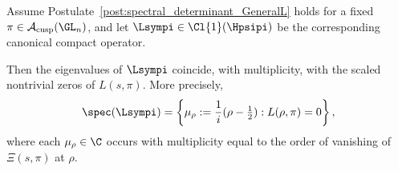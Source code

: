 \begin{lemma}%
\label{lem:zero_encoding_general}
Assume Postulate~\ref{post:spectral_determinant_GeneralL} holds for a fixed \( \pi \in \mathcal{A}_{\mathrm{cusp}}(\GL_n) \), and let \( \Lsympi \in \Cl{1}(\Hpsipi) \) be the corresponding canonical compact operator.

Then the eigenvalues of \( \Lsympi \) coincide, with multiplicity, with the scaled nontrivial zeros of \( L(s, \pi) \). More precisely,
\[
\spec(\Lsympi) = \left\{ \mu_\rho := \frac{1}{i}(\rho - \tfrac{1}{2}) : L(\rho, \pi) = 0 \right\},
\]
where each \( \mu_\rho \in \C \) occurs with multiplicity equal to the order of vanishing of \( \Xi(s, \pi) \) at \( \rho \).

\end{lemma}
